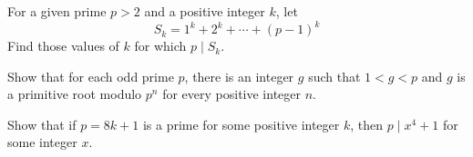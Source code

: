 \documentclass{subfile}
\begin{document}
	\begin{problem}
		For a given prime $p > 2$ and a positive integer $k$, let \[ S_k = 1^k + 2^k + \cdots + (p - 1)^k\] Find those values of $k$ for which $p \mid S_k$. %
	\end{problem}


	\begin{problem}
		Show that for each odd prime $p$, there is an integer $g$ such that $1<g<p$ and $g$ is a primitive root modulo $p^n$ for every positive integer $n$. %
	\end{problem}


	\begin{problem}
		Show that if $p=8k+1$ is a prime for some positive integer $k$, then $p\mid x^4+1$ for some integer $x$. %
	\end{problem}
\end{document}
